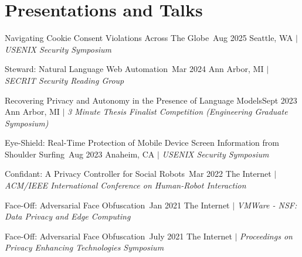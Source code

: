 \section{Presentations and Talks}
  \CVSubHeadingListStart
    \CVSubheading
      {{Navigating Cookie Consent Violations Across The Globe~\cite{ConsentChk}}}{Aug 2025}
      {{Seattle, WA} $|$ \emph{\small{USENIX Security Symposium}}}{}
    
    \CVSubheading
      {{Steward: Natural Language Web Automation~\cite{steward}}}{Mar 2024}
      {{Ann Arbor, MI} $|$ \emph{\small{SECRIT Security Reading Group}}}{}

    \CVSubheading
      {{Recovering Privacy and Autonomy in the Presence of Language Models}}{Sept 2023}
      {{Ann Arbor, MI} $|$ \emph{\small{3 Minute Thesis Finalist Competition (Engineering Graduate Symposium)}}}{}

    \CVSubheading
      {{Eye-Shield: Real-Time Protection of Mobile Device Screen Information from Shoulder Surfing}~\cite{ShoulderSurfing}}{Aug 2023}
      {{Anaheim, CA} $|$ \emph{\small{USENIX Security Symposium}}}{}

    \CVSubheading
      {{Confidant: A Privacy Controller for Social Robots}~\cite{HRIPrivacy}}{Mar 2022}
      {{The Internet} $|$ \emph{\small{ACM/IEEE International Conference on Human-Robot Interaction}}}{}

    \CVSubheading
      {{Face-Off: Adversarial Face Obfuscation}~\cite{FaceOff}}{Jan 2021}
      {{The Internet} $|$ \emph{\small{VMWare - NSF: Data Privacy and Edge Computing}}}{}
      
    \CVSubheading
      {{Face-Off: Adversarial Face Obfuscation}~\cite{FaceOff}}{July 2021}
      {{The Internet} $|$ \emph{\small{Proceedings on Privacy Enhancing Technologies Symposium}}}{}
  \CVSubHeadingListEnd
